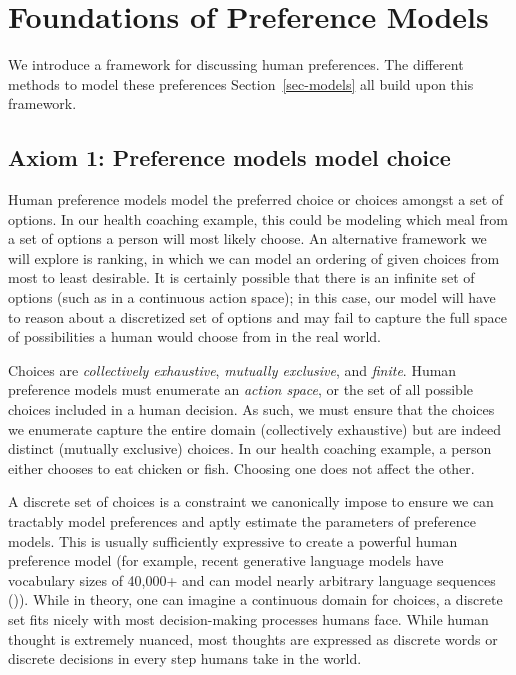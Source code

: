 \documentclass[
  letterpaper,
  numbers=noenddot,
  DIV=11]{scrreprt}
\theoremstyle{definition}
\theoremstyle{plain}
\theoremstyle{plain}
\theoremstyle{remark}
\begin{document}
\section{Foundations of Preference Models}\label{sec-foundations}

We introduce a framework for discussing human preferences. The different
methods to model these preferences Section~\ref{sec-models} all build
upon this framework.

\subsection*{Axiom 1: Preference models model
choice}\label{axiom-1-preference-models-model-choice}

Human preference models model the preferred choice or choices amongst a
set of options. In our health coaching example, this could be modeling
which meal from a set of options a person will most likely choose. An
alternative framework we will explore is ranking, in which we can model
an ordering of given choices from most to least desirable. It is
certainly possible that there is an infinite set of options (such as in
a continuous action space); in this case, our model will have to reason
about a discretized set of options and may fail to capture the full
space of possibilities a human would choose from in the real world.

Choices are \emph{collectively exhaustive}, \emph{mutually exclusive},
and \emph{finite}. Human preference models must enumerate an
\emph{action space}, or the set of all possible choices included in a
human decision. As such, we must ensure that the choices we enumerate
capture the entire domain (collectively exhaustive) but are indeed
distinct (mutually exclusive) choices. In our health coaching example, a
person either chooses to eat chicken or fish. Choosing one does not
affect the other.

A discrete set of choices is a constraint we canonically impose to
ensure we can tractably model preferences and aptly estimate the
parameters of preference models. This is usually sufficiently expressive
to create a powerful human preference model (for example, recent
generative language models have vocabulary sizes of 40,000+ and can
model nearly arbitrary language sequences
()). While in theory,
one can imagine a continuous domain for choices, a discrete set fits
nicely with most decision-making processes humans face. While human
thought is extremely nuanced, most thoughts are expressed as discrete
words or discrete decisions in every step humans take in the world.
\end{document}
